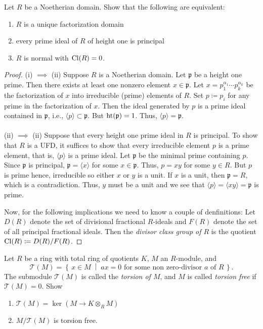\begin{problem}
Let $R$ be a Noetherian domain. Show that the following are equivalent:
\begin{enumerate}[label=(\roman*)]
\item $R$ is a unique factorization domain
\item every prime ideal of $R$ of height one is principal
\item $R$ is normal with $\operatorname{Cl}(R)=0$.
\end{enumerate}
\end{problem}
\begin{proof}
(i) $\implies$ (ii) Suppose $R$ is a Noetherian domain. Let $\mathfrak{p}$
be a height one prime. Then there exists at least one nonzero element
$x\in\mathfrak{p}$. Let $x=p_1^{\alpha_1}\cdots p_k^{\alpha_k}$ be the
factorization of $x$ into irreducible (prime) elements of $R$. Set
$p\coloneqq p_i$ for any prime in the factorization of $x$. Then the ideal
generated by $p$ is a prime ideal contained in $\mathfrak{p}$, i.e.,
$\langle p \rangle\subset\mathfrak{p}$. But $\operatorname{ht}(\mathfrak{p})=1$. Thus,
$\langle p \rangle=\mathfrak{p}$.
\\\\
(ii) $\implies$ (ii) Suppose that every height one prime ideal in $R$ is
principal. To show that $R$ is a UFD, it suffices to show that every
irreducible element $p$ is a prime element, that is, $\langle p\rangle$ is
a prime ideal. Let $\mathfrak{p}$ be the minimal prime containing
$p$. Since $\mathfrak{p}$ is principal, $\mathfrak{p}=\langle x\rangle$ for
some $x\in\mathfrak{p}$. Thus, $p=xy$ for some $y\in R$. But $p$ is prime
hence, irreducible so either $x$ or $y$ is a unit. If $x$ is a unit, then
$\mathfrak{p}=R$, which is a contradiction. Thus, $y$ must be a unit and we
see that $\langle p\rangle=\langle xy\rangle=\mathfrak{p}$ is
prime.

Now, for the following implications we need to know a couple of
denfinitions: Let $D(R)$ denote the set of divisional fractional $R$-ideals
and $F(R)$ denote the set of all principal fractional ideals. Then the
\emph{divisor class group of $R$} is the quotient $\operatorname{Cl}(R)\coloneqq
D(R)/F(R)$.
\end{proof}
\newpage
\begin{problem}
Let $R$ be a ring with total ring of quotients $K$, $M$ an $R$-module, and
\[
\mathcal{T}(M)=
\left\{\,x\in M\;\middle|\;
\text{$ax=0$ for some non zero-divisor $a$ of $R$}\,\right\}.
\]
The submodule $\mathcal{T}(M)$ is called the \emph{torsion of $M$}, and $M$
is called \emph{torsion free} if $\mathcal{T}(M)=0$. Show
\begin{enumerate}[label=(\alph*)]
\item $\mathcal{T}(M)=\ker(M\to K\otimes_R M)$
\item $M/\mathcal{T}(M)$ is torsion free.
\end{enumerate}
\end{problem}

